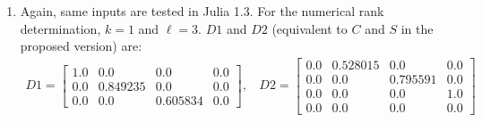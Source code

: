 \begin{example}
{\begin{enumerate}[(1).]
\item Again, same inputs are tested in Julia 1.3. For the numerical rank determination, $k = 1$ and $\ell = 3$. $D1$ and $D2$ (equivalent to $C$ and $S$ in the proposed version) are:
\begin{align*}
D1 = \begin{bmatrix}
 1.0 & 0.0  &     0.0  &     0.0 \\
 0.0 & 0.849235 & 0.0  &     0.0 \\
 0.0 & 0.0  &  0.605834  & 0.0 
\end{bmatrix}, \ \ \ \
D2 = \begin{bmatrix}
 0.0 & 0.528015 & 0.0 & 0.0 \\
 0.0 & 0.0 & 0.795591 & 0.0 \\
 0.0 & 0.0 & 0.0 & 1.0 \\
 0.0 & 0.0 & 0.0 & 0.0
 \end{bmatrix}
\end{align*}


\end{enumerate}}
\end{example}
